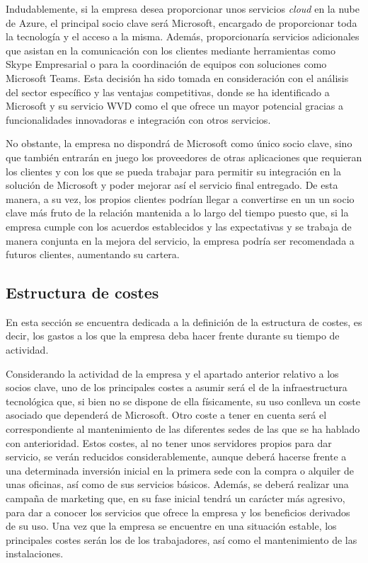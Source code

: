 Indudablemente, si la empresa desea proporcionar unos servicios \textit{cloud} en la nube de Azure, el principal socio clave será Microsoft, encargado de proporcionar toda la tecnología y el acceso a la misma. Además, proporcionaría servicios adicionales que asistan en la comunicación con los clientes mediante herramientas como Skype Empresarial o para la coordinación de equipos con soluciones como Microsoft Teams. Esta decisión ha sido tomada en consideración con el análisis del sector específico y las ventajas competitivas, donde se ha identificado a Microsoft y su servicio \acs{WVD} como el que ofrece un mayor potencial gracias a funcionalidades innovadoras e integración con otros servicios.

No obstante, la empresa no dispondrá de Microsoft como único socio clave, sino que también entrarán en juego los proveedores de otras aplicaciones que requieran los clientes y con los que se pueda trabajar para permitir su integración en la solución de Microsoft y poder mejorar así el servicio final entregado. De esta manera, a su vez, los propios clientes podrían llegar a convertirse en un un socio clave más fruto de la relación mantenida a lo largo del tiempo puesto que, si la empresa cumple con los acuerdos establecidos y las expectativas y se trabaja de manera conjunta en la mejora del servicio, la empresa podría ser recomendada a futuros clientes, aumentando su cartera.

\subsection{Estructura de costes}
En esta sección se encuentra dedicada a la definición de la estructura de costes, es decir, los gastos a los que la empresa deba hacer frente durante su tiempo de actividad.

Considerando la actividad de la empresa y el apartado anterior relativo a los socios clave, uno de los principales costes a asumir será el de la infraestructura tecnológica que, si bien no se dispone de ella físicamente, su uso conlleva un coste asociado que dependerá de Microsoft. Otro coste a tener en cuenta será el correspondiente al mantenimiento de las diferentes sedes de las que se ha hablado con anterioridad. Estos costes, al no tener unos servidores propios para dar servicio, se verán reducidos considerablemente, aunque deberá hacerse frente a una determinada inversión inicial en la primera sede con la compra o alquiler de unas oficinas, así como de sus servicios básicos. Además, se deberá realizar una campaña de marketing que, en su fase inicial tendrá un carácter más agresivo, para dar a conocer los servicios que ofrece la empresa y los beneficios derivados de su uso. Una vez que la empresa se encuentre en una situación estable, los principales costes serán los de los trabajadores, así como el mantenimiento de las instalaciones.

